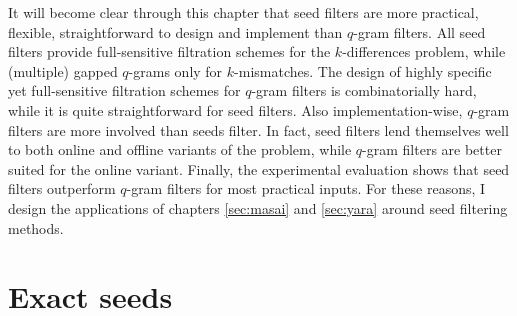 It will become clear through this chapter that seed filters are more practical, flexible, straightforward to design and implement than $q$-gram filters.
All seed filters provide full-sensitive filtration schemes for the $k$-differences problem, while (multiple) gapped $q$-grams only for $k$-mismatches.
The design of highly specific yet full-sensitive filtration schemes for $q$-gram filters is combinatorially hard, while it is quite straightforward for seed filters.
Also implementation-wise, $q$-gram filters are more involved than seeds filter.
In fact, seed filters lend themselves well to both online and offline variants of the problem, while $q$-gram filters are better suited for the online variant.
Finally, the experimental evaluation shows that seed filters outperform $q$-gram filters for most practical inputs.
For these reasons, I design the applications of chapters \ref{sec:masai} and \ref{sec:yara} around seed filtering methods.





\section{Exact seeds}
\label{sec:filtering:exact}

